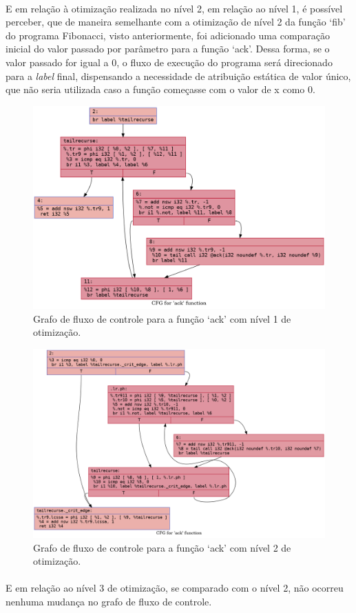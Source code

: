 \documentclass[12pt]{article}
\begin{document}
\paragraph{}E em relação à otimização realizada no nível 2, em relação ao nível 1, é possível perceber, que de maneira semelhante com a otimização de nível 2 da função ‘fib’ do programa Fibonacci, visto anteriormente, foi adicionado uma comparação inicial do valor passado por parâmetro para a função ‘ack’. Dessa forma, se o valor passado for igual a 0, o fluxo de execução do programa será direcionado para a \textit{label} final, dispensando a necessidade de atribuição estática de valor único, que não seria utilizada caso a função começasse com o valor de x como 0.

\begin{figure}
    \centering
    \includegraphics[width=0.5\linewidth]{recursive_.ack_O1.png}
    \caption{Grafo de fluxo de controle para a função ‘ack’ com nível 1 de otimização.}
\end{figure}

\begin{figure}
    \centering
    \includegraphics[width=0.5\linewidth]{recursive_.ack_O2.png}
    \caption{Grafo de fluxo de controle para a função ‘ack’ com nível 2 de otimização.}
\end{figure}

\paragraph{}E em relação ao nível 3 de otimização, se comparado com o nível 2, não ocorreu nenhuma mudança no grafo de fluxo de controle.
\end{document}
